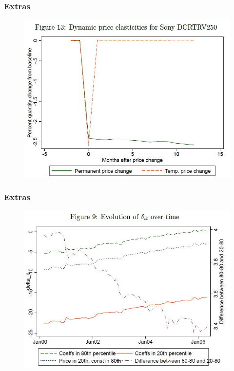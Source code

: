 \documentclass{beamer}
\theoremstyle{definition}
\begin{document}
\begin{frame}
  \frametitle{Extras}

  \begin{figure}
    \includegraphics[width=\linewidth]{13.JPG}
  \end{figure}
\end{frame}

\begin{frame}
  \frametitle{Extras}

  \begin{figure}
    \includegraphics[width=\linewidth]{9.JPG}
  \end{figure}
\end{frame}
\end{document}
